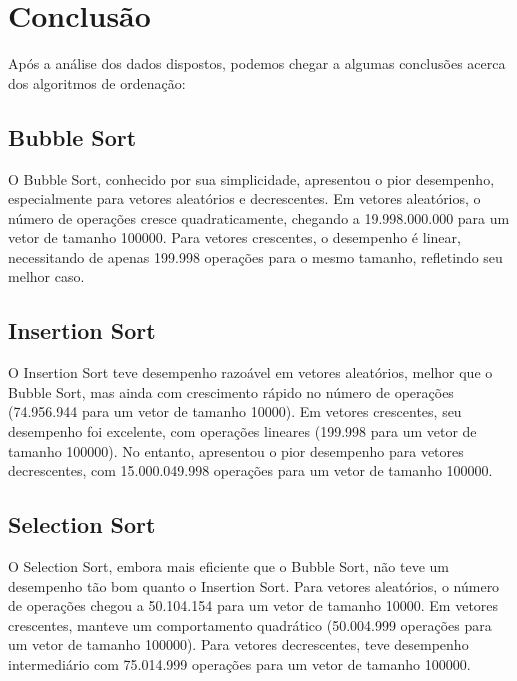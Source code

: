 \section{Conclusão}

Após a análise dos dados dispostos, podemos chegar a algumas conclusões acerca dos algoritmos de ordenação:

\subsection{Bubble Sort}

O Bubble Sort, conhecido por sua simplicidade, apresentou o pior desempenho, especialmente para vetores aleatórios e decrescentes. Em vetores aleatórios, o número de operações cresce quadraticamente, chegando a 19.998.000.000 para um vetor de tamanho 100000. Para vetores crescentes, o desempenho é linear, necessitando de apenas 199.998 operações para o mesmo tamanho, refletindo seu melhor caso.

\subsection{Insertion Sort}

O Insertion Sort teve desempenho razoável em vetores aleatórios, melhor que o Bubble Sort, mas ainda com crescimento rápido no número de operações (74.956.944 para um vetor de tamanho 10000). Em vetores crescentes, seu desempenho foi excelente, com operações lineares (199.998 para um vetor de tamanho 100000). No entanto, apresentou o pior desempenho para vetores decrescentes, com 15.000.049.998 operações para um vetor de tamanho 100000.

\subsection{Selection Sort}

O Selection Sort, embora mais eficiente que o Bubble Sort, não teve um desempenho tão bom quanto o Insertion Sort. Para vetores aleatórios, o número de operações chegou a 50.104.154 para um vetor de tamanho 10000. Em vetores crescentes, manteve um comportamento quadrático (50.004.999 operações para um vetor de tamanho 100000). Para vetores decrescentes, teve desempenho intermediário com 75.014.999 operações para um vetor de tamanho 100000.